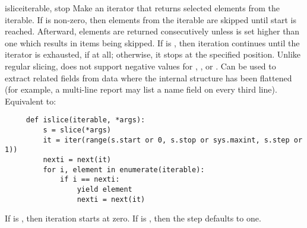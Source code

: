 \begin{funcdesc}{islice}{iterable,  stop }
  Make an iterator that returns selected elements from the iterable.
  If  is non-zero, then elements from the iterable are skipped
  until start is reached.  Afterward, elements are returned consecutively
  unless  is set higher than one which results in items being
  skipped.  If  is , then iteration continues until
  the iterator is exhausted, if at all; otherwise, it stops at the specified
  position.  Unlike regular slicing,
   does not support negative values for ,
  , or .  Can be used to extract related fields
  from data where the internal structure has been flattened (for
  example, a multi-line report may list a name field on every
  third line).  Equivalent to:

  \begin{verbatim}
     def islice(iterable, *args):
         s = slice(*args)
         it = iter(range(s.start or 0, s.stop or sys.maxint, s.step or 1))
         nexti = next(it)
         for i, element in enumerate(iterable):
             if i == nexti:
                 yield element
                 nexti = next(it)
  \end{verbatim}

  If  is , then iteration starts at zero.
  If  is , then the step defaults to one.
\end{funcdesc}

